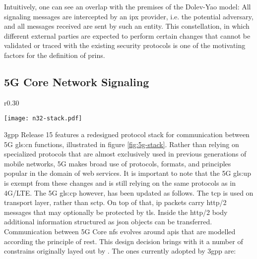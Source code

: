 Intuitively, one can see an overlap with the premises of the Dolev-Yao model: All signaling messages are intercepted by an \gls{ipx} provider, i.e. the potential adversary, and all messages received are sent by such an entity.
This constellation, in which different external parties are expected to perform certain changes that cannot be validated or traced with the existing security protocols is one of the motivating factors for the definition of \gls{prins}.

\subsection{5G Core Network Signaling}

\begin{wrapfigure}{r}{0.30\textwidth}
    \begin{center}
    \texttt{[image: n32-stack.pdf]}
    \end{center}
    \caption{5G control plane stack, according to TS 29.573 (\cite{3gpp.29.573}, p. 11)}
    \label{fig:5g-stack}
\end{wrapfigure}

\gls{3gpp} Release 15 features a redesigned protocol stack for communication between 5G \gls{gls:cn} functions, illustrated in figure \ref{fig:5g-stack}.
Rather than relying on specialized protocols that are almost exclusively used in previous generations of mobile networks, 5G makes broad use of protocols, formats, and principles popular in the domain of web services.
It is important to note that the 5G \gls{gls:up} is exempt from these changes and is still relying on the same protocols as in 4G/LTE.
The 5G \gls{gls:cp} however, has been updated as follows.
The \gls{tcp} is used on transport layer, rather than \gls{sctp}.
On top of that, \gls{ip} packets carry \gls{http}/2 messages that may optionally be protected by \gls{tls}.
Inside the \gls{http}/2 body additional information structured as \gls{json} objects can be transferred.
Communication between 5G Core \glspl{nf} evolves around \glspl{api} that are modelled according the principle of \gls{rest}.
This design decision brings with it a number of constrains originally layed out by \cite{fielding2000arch}.
The ones currently adopted by \gls{3gpp} are:

